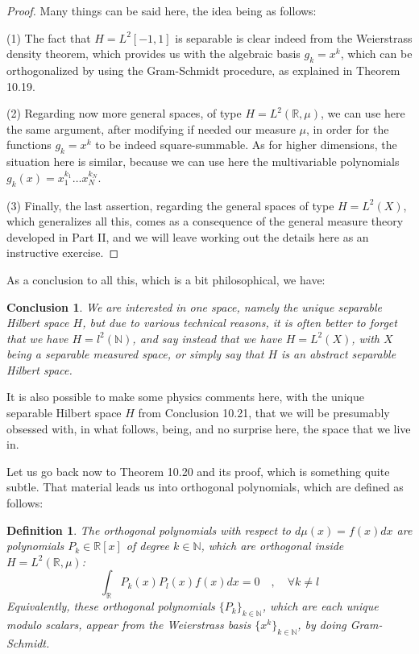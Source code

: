 \documentclass[12pt]{amsbook}
\newtheorem{conclusion}[theorem]{Conclusion}
\newtheorem{definition}[theorem]{Definition}
\begin{document}
\begin{proof}
Many things can be said here, the idea being as follows:

\medskip

(1) The fact that $H=L^2[-1,1]$ is separable is clear indeed from the Weierstrass density theorem, which provides us with the algebraic basis $g_k=x^k$, which can be orthogonalized by using the Gram-Schmidt procedure, as explained in Theorem 10.19.

\medskip

(2) Regarding now more general spaces, of type $H=L^2(\mathbb R,\mu)$, we can use here the same argument, after modifying if needed our measure $\mu$, in order for the functions $g_k=x^k$ to be indeed square-summable. As for higher dimensions, the situation here is similar, because we can use here the multivariable polynomials $g_k(x)=x_1^{k_1}\ldots x_N^{k_N}$.

\medskip

(3) Finally, the last assertion, regarding the general spaces of type $H=L^2(X)$, which generalizes all this, comes as a consequence of the general measure theory developed in Part II, and we will leave working out the details here as an instructive exercise.
\end{proof}

As a conclusion to all this, which is a bit philosophical, we have:

\begin{conclusion}
We are interested in one space, namely the unique separable Hilbert space $H$, but due to various technical reasons, it is often better to forget that we have $H=l^2(\mathbb N)$, and say instead that we have $H=L^2(X)$, with $X$ being a separable measured space, or simply say that $H$ is an abstract separable Hilbert space.
\end{conclusion}

It is also possible to make some physics comments here, with the unique separable Hilbert space $H$ from Conclusion 10.21, that we will be presumably obsessed with, in what follows, being, and no surprise here, the space that we live in.

\bigskip

Let us go back now to Theorem 10.20 and its proof, which is something quite subtle. That material leads us into orthogonal polynomials, which are defined as follows:


\begin{definition}
The orthogonal polynomials with respect to $d\mu(x)=f(x)dx$ are polynomials $P_k\in\mathbb R[x]$ of degree $k\in\mathbb N$, which are orthogonal inside $H=L^2(\mathbb R,\mu)$:
$$\int_\mathbb RP_k(x)P_l(x)f(x)dx=0\quad,\quad\forall k\neq l$$
Equivalently, these orthogonal polynomials $\{P_k\}_{k\in\mathbb N}$, which are each unique modulo scalars, appear from the Weierstrass basis $\{x^k\}_{k\in\mathbb N}$, by doing Gram-Schmidt.
\end{definition}
\end{document}
